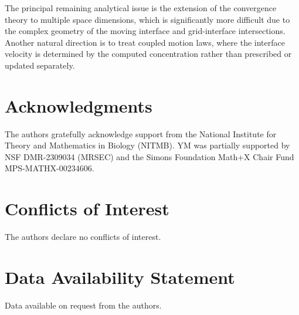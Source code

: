 \documentclass[11pt,reqno]{amsart}
\theoremstyle{plain}
\theoremstyle{definition}
\numberwithin{equation}{section}
\begin{document}
The principal remaining analytical issue is the extension of the convergence
theory to multiple space dimensions, which is significantly more difficult due to the complex geometry of the moving interface and grid-interface intersections. Another natural direction is to treat coupled motion laws, where the interface velocity is determined by the computed concentration rather than prescribed or updated separately.


\section*{Acknowledgments}
The authors gratefully acknowledge support from the National Institute for Theory and Mathematics in Biology (NITMB).
YM was partially supported by NSF DMR-2309034 (MRSEC) and the Simons Foundation Math+X Chair Fund MPS-MATHX-00234606.

\section*{Conflicts of Interest}
The authors declare no conflicts of interest.

\section*{Data Availability Statement}
Data available on request from the authors.




\end{document}
